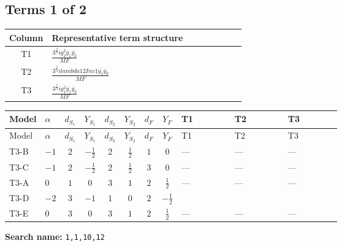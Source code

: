 \documentclass[8pt]{article}
\begin{document}
\begin{landscape}
\subsection*{Terms 1 of 2}
\begin{center}
\begin{tabular}{@{}c >{\raggedright\arraybackslash}p{0.82\linewidth}@{}}
\toprule
Column & Representative term structure \\
\midrule
T1 & \(\displaystyle \frac{3^{\frac{3}{4}} i g_{2}^{2} \overline{y_{1}} \overline{y_{2}}}{MF}\) \\
\midrule
T2 & \(\displaystyle \frac{3^{\frac{3}{4}} i lambda12Inv1 \overline{y_{1}} \overline{y_{2}}}{MF}\) \\
\midrule
T3 & \(\displaystyle \frac{3^{\frac{3}{4}} i g_{1}^{2} \overline{y_{1}} \overline{y_{2}}}{MF}\) \\
\midrule
\bottomrule
\end{tabular}
\end{center}
\smallskip
\tiny
\begin{longtable}{@{}llcccccc >{\raggedright\arraybackslash}p{0.21\linewidth} >{\raggedright\arraybackslash}p{0.21\linewidth} >{\raggedright\arraybackslash}p{0.21\linewidth}@{}}
\toprule
Model & $\alpha$ & $d_{S_1}$ & $Y_{S_1}$ & $d_{S_2}$ & $Y_{S_2}$ & $d_F$ & $Y_F$ & T1 & T2 & T3 \\
\midrule
\endfirsthead
\toprule
Model & $\alpha$ & $d_{S_1}$ & $Y_{S_1}$ & $d_{S_2}$ & $Y_{S_2}$ & $d_F$ & $Y_F$ & T1 & T2 & T3 \\
\midrule
\endhead
T3-B & $-1$ & $2$ & $-\frac{1}{2}$ & $2$ & $\frac{1}{2}$ & $1$ & $0$ & --- & --- & --- \\
\midrule
T3-C & $-1$ & $2$ & $-\frac{1}{2}$ & $2$ & $\frac{1}{2}$ & $3$ & $0$ & --- & --- & --- \\
\midrule
T3-A & $0$ & $1$ & $0$ & $3$ & $1$ & $2$ & $\frac{1}{2}$ & --- & --- & --- \\
\midrule
T3-D & $-2$ & $3$ & $-1$ & $1$ & $0$ & $2$ & $-\frac{1}{2}$ & \scriptsize\adjustbox{max width=\linewidth}{$\begin{gathered} - \frac{11 \cdot 3^{\frac{3}{4}} i g_{2}^{2} \overline{y_{1}} \overline{y_{2}}}{8 MF}\end{gathered}$} & \scriptsize\adjustbox{max width=\linewidth}{$\begin{gathered} - \frac{3^{\frac{3}{4}} i lambda12Inv1 \overline{y_{1}} \overline{y_{2}}}{6 MF}\end{gathered}$} & \scriptsize\adjustbox{max width=\linewidth}{$\begin{gathered} - \frac{3^{\frac{3}{4}} i g_{1}^{2} \overline{y_{1}} \overline{y_{2}}}{8 MF}\end{gathered}$} \\
\midrule
T3-E & $0$ & $3$ & $0$ & $3$ & $1$ & $2$ & $\frac{1}{2}$ & --- & --- & --- \\
\midrule
\bottomrule
\end{longtable}
\clearpage
\noindent\textbf{Search name: }\texttt{1,1,10,12}\par\smallskip

\end{landscape}
\end{document}
